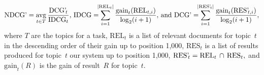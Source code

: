 \begin{equation}
  \text{NDCG'} = \operatorname*{avg}_{t\in T}\frac{\text{DCG'}_{\!t}}{\text{IDCG}_t},\,
  \text{IDCG} =\!\!\!\sum_{i=1}^{|\text{REL}_t|} \frac{\text{gain}_t(\text{REL}_{t,i})}{\log_2(i+1)},\,
  \text{and DCG'} =\!\!\!\sum_{i=1}^{|\text{RES'\!}_t|} \frac{\text{gain}_t(\text{RES'\!}_{t,i})}{\log_2(i+1)},
\end{equation}
where $T$ are the topics for a task, $\text{REL}_t$ is a list of relevant documents
for topic~$t$ in the descending order of their gain up to position 1,000,
$\text{RES}_t$ is a list of results produced for topic~$t$ our system up to position
1,000, $\text{RES'\!}_t=\text{REL}_t\,\cap\,\text{RES}_t,$ and
$\text{gain}_t(R)$ is the gain of result~$R$ for topic~$t$.
